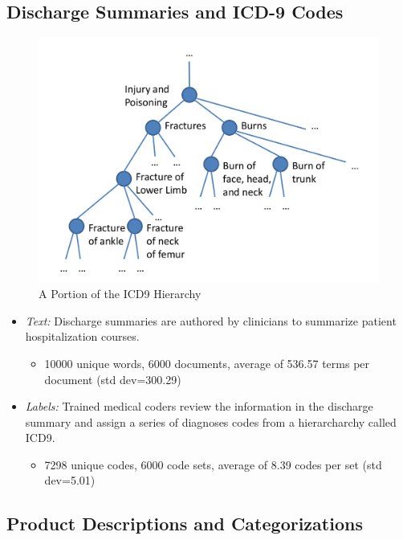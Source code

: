 \documentclass[portrait]{sciposter}
\begin{document}
\begin{multicols}{3}
\subsection{Discharge Summaries and ICD-9 Codes}

\begin{figure}
\centering
\includegraphics[width=25cm]{ICD9_crop}
\small{\caption{A Portion of the ICD9 Hierarchy}}
\end{figure}

\begin{itemize}
\item \emph{Text:} Discharge summaries are authored by clinicians to summarize patient hospitalization courses.
\begin{itemize}
\item 10000 unique words, 6000 documents, average of 536.57 terms per document (std dev=300.29)
\end{itemize}
\item \emph{Labels:} Trained medical coders review the information in the discharge summary and assign a series of diagnoses codes from a hierarcharchy called ICD9.
\begin{itemize}
\item 7298 unique codes, 6000 code sets, average of 8.39 codes per set (std dev=5.01)
\end{itemize}
\end{itemize}


\subsection{Product Descriptions and Categorizations}


\end{multicols}
\end{document}
